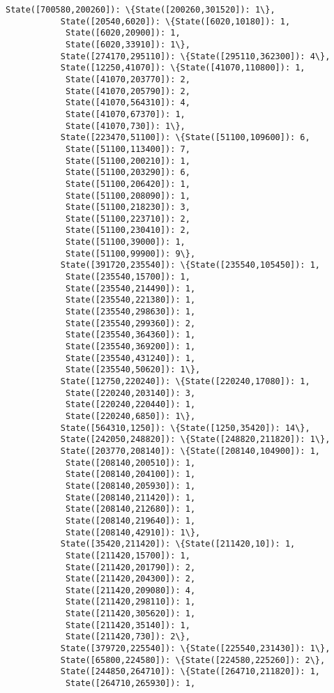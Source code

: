 \documentclass[11pt]{article}
\begin{document}
\begin{Verbatim}[commandchars=\\\{\}]
           State([700580,200260]): \{State([200260,301520]): 1\},
           State([20540,6020]): \{State([6020,10180]): 1,
            State([6020,20900]): 1,
            State([6020,33910]): 1\},
           State([274170,295110]): \{State([295110,362300]): 4\},
           State([12250,41070]): \{State([41070,110800]): 1,
            State([41070,203770]): 2,
            State([41070,205790]): 2,
            State([41070,564310]): 4,
            State([41070,67370]): 1,
            State([41070,730]): 1\},
           State([223470,51100]): \{State([51100,109600]): 6,
            State([51100,113400]): 7,
            State([51100,200210]): 1,
            State([51100,203290]): 6,
            State([51100,206420]): 1,
            State([51100,208090]): 1,
            State([51100,218230]): 3,
            State([51100,223710]): 2,
            State([51100,230410]): 2,
            State([51100,39000]): 1,
            State([51100,99900]): 9\},
           State([391720,235540]): \{State([235540,105450]): 1,
            State([235540,15700]): 1,
            State([235540,214490]): 1,
            State([235540,221380]): 1,
            State([235540,298630]): 1,
            State([235540,299360]): 2,
            State([235540,364360]): 1,
            State([235540,369200]): 1,
            State([235540,431240]): 1,
            State([235540,50620]): 1\},
           State([12750,220240]): \{State([220240,17080]): 1,
            State([220240,203140]): 3,
            State([220240,220440]): 1,
            State([220240,6850]): 1\},
           State([564310,1250]): \{State([1250,35420]): 14\},
           State([242050,248820]): \{State([248820,211820]): 1\},
           State([203770,208140]): \{State([208140,104900]): 1,
            State([208140,200510]): 1,
            State([208140,204100]): 1,
            State([208140,205930]): 1,
            State([208140,211420]): 1,
            State([208140,212680]): 1,
            State([208140,219640]): 1,
            State([208140,42910]): 1\},
           State([35420,211420]): \{State([211420,10]): 1,
            State([211420,15700]): 1,
            State([211420,201790]): 2,
            State([211420,204300]): 2,
            State([211420,209080]): 4,
            State([211420,298110]): 1,
            State([211420,305620]): 1,
            State([211420,35140]): 1,
            State([211420,730]): 2\},
           State([379720,225540]): \{State([225540,231430]): 1\},
           State([65800,224580]): \{State([224580,225260]): 2\},
           State([244850,264710]): \{State([264710,211820]): 1,
            State([264710,265930]): 1,

\end{Verbatim}
\end{document}
